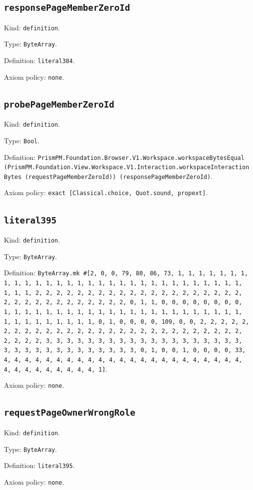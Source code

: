 \documentclass[11pt]{article}
\begin{document}
\subsection*{\texttt{responsePageMemberZeroId}}
\noindent Kind: \texttt{definition}.\par
\noindent Type: \texttt{ByteArray}.\par
\noindent Definition: \texttt{literal384}.\par
\noindent Axiom policy: \texttt{none}.\par
\subsection*{\texttt{probePageMemberZeroId}}
\noindent Kind: \texttt{definition}.\par
\noindent Type: \texttt{Bool}.\par
\noindent Definition: \texttt{PrismPM.Foundation.Browser.V1.Workspace.workspaceBytesEqual (PrismPM.Foundation.View.Workspace.V1.Interaction.workspaceInteractionBytes (requestPageMemberZeroId)) (responsePageMemberZeroId)}.\par
\noindent Axiom policy: \texttt{exact [Classical.choice, Quot.sound, propext]}.\par
\subsection*{\texttt{literal395}}
\noindent Kind: \texttt{definition}.\par
\noindent Type: \texttt{ByteArray}.\par
\noindent Definition: \texttt{ByteArray.mk \#[2, 0, 0, 79, 80, 86, 73, 1, 1, 1, 1, 1, 1, 1, 1, 1, 1, 1, 1, 1, 1, 1, 1, 1, 1, 1, 1, 1, 1, 1, 1, 1, 1, 1, 1, 1, 1, 1, 1, 1, 2, 2, 2, 2, 2, 2, 2, 2, 2, 2, 2, 2, 2, 2, 2, 2, 2, 2, 2, 2, 2, 2, 2, 2, 2, 2, 2, 2, 2, 2, 2, 2, 0, 1, 1, 0, 0, 0, 0, 0, 0, 0, 0, 1, 1, 1, 1, 1, 1, 1, 1, 1, 1, 1, 1, 1, 1, 1, 1, 1, 1, 1, 1, 1, 1, 1, 1, 1, 1, 1, 1, 1, 1, 1, 1, 0, 1, 0, 0, 0, 0, 109, 0, 0, 2, 2, 2, 2, 2, 2, 2, 2, 2, 2, 2, 2, 2, 2, 2, 2, 2, 2, 2, 2, 2, 2, 2, 2, 2, 2, 2, 2, 2, 2, 2, 2, 3, 3, 3, 3, 3, 3, 3, 3, 3, 3, 3, 3, 3, 3, 3, 3, 3, 3, 3, 3, 3, 3, 3, 3, 3, 3, 3, 3, 3, 3, 3, 3, 0, 1, 0, 0, 1, 0, 0, 0, 0, 33, 4, 4, 4, 4, 4, 4, 4, 4, 4, 4, 4, 4, 4, 4, 4, 4, 4, 4, 4, 4, 4, 4, 4, 4, 4, 4, 4, 4, 4, 4, 4, 4, 1]}.\par
\noindent Axiom policy: \texttt{none}.\par
\subsection*{\texttt{requestPageOwnerWrongRole}}
\noindent Kind: \texttt{definition}.\par
\noindent Type: \texttt{ByteArray}.\par
\noindent Definition: \texttt{literal395}.\par
\noindent Axiom policy: \texttt{none}.\par
\end{document}
